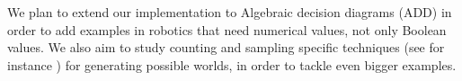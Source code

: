 We plan to extend our implementation to Algebraic decision diagrams (ADD) \cite{DBLP:journals/fmsd/BaharFGHMPS97} in order to add examples in robotics that need numerical values, not only Boolean values.
%
We also aim to study counting and sampling specific techniques (see for instance \citet{DBLP:conf/aaai/MeelVCFSFIM16}) for generating possible worlds, in order to tackle even bigger examples.

